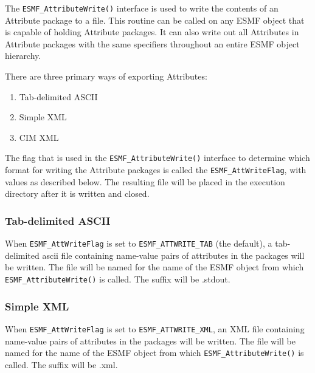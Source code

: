 %

\label{sec:AttributeExports}

The {\tt ESMF\_AttributeWrite()} interface is used to write the contents of an Attribute package to a file.  This routine can be called on any ESMF object that is capable of holding Attribute packages.  It can also write out all Attributes in Attribute packages with the same specifiers throughout an entire ESMF object hierarchy. 

There are three primary ways of exporting Attributes:
\begin{enumerate}
   \item Tab-delimited ASCII
   \item Simple XML 
   \item CIM XML
\end{enumerate}

The flag that is used in the {\tt ESMF\_AttributeWrite()} interface to determine which format for writing the Attribute packages is called the {\tt ESMF\_AttWriteFlag}, with values as described below.  The resulting file will be placed in the execution directory after it is written and closed.

\subsubsection{Tab-delimited ASCII}

When {\tt ESMF\_AttWriteFlag} is set to {\tt ESMF\_ATTWRITE\_TAB} (the default), a tab-delimited ascii file containing name-value pairs of attributes in the packages will be written.  The file will be named for the name of the ESMF object from which {\tt ESMF\_AttributeWrite()} is called. The suffix will be .stdout.


\subsubsection{Simple XML}

When {\tt ESMF\_AttWriteFlag} is set to {\tt ESMF\_ATTWRITE\_XML}, an XML file containing name-value pairs of attributes in the packages will be written.  The file will be named for the name of the ESMF object from which {\tt ESMF\_AttributeWrite()} is called. The suffix will be .xml.

